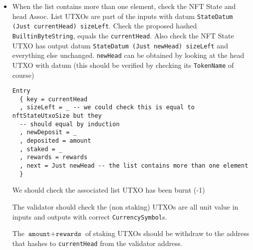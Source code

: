 \documentclass[10pt, a4paper]{article}
\theoremstyle{definition}
\begin{document}
\begin{enumerate}
{\begin{itemize}
{The $\texttt{amount} + \texttt{rewards}$ of staking UTXOs should be withdraw to the address that hashes to \texttt{currentHead} from the validator address.
}

\item{
When the list contains more than one element, check the NFT State and head Assoc. List UTXOs are part of the inputs with datum \texttt{StateDatum (Just currentHead) sizeLeft}. Check the proposed hashed \texttt{BuiltinByteString}, equals the \texttt{currentHead}. Also check the NFT State UTXO has output datum \texttt{StateDatum (Just newHead) sizeLeft} and everything else unchanged. \texttt{newHead} can be obtained by looking at the head UTXO with datum (this should be verified by checking its \texttt{TokenName} of course)
\begin{verbatim}
Entry
  { key = currentHead
  , sizeLeft = _ -- we could check this is equal to nftStateUtxoSize but they
  -- should equal by induction
  , newDeposit = _
  , deposited = amount
  , staked = _
  , rewards = rewards 
  , next = Just newHead -- the list contains more than one element
  }
\end{verbatim}


 We should check the associated list UTXO has been burnt (-1)

The validator should check the (non staking) UTXOs are all unit value in inputs and outputs with correct \texttt{CurrencySymbol}s.

The $\texttt{amount} + \texttt{rewards}$ of staking UTXOs should be withdraw to the address that hashes to \texttt{currentHead} from the validator address.
}

\end{itemize} 

}
\end{enumerate}
\end{document}
